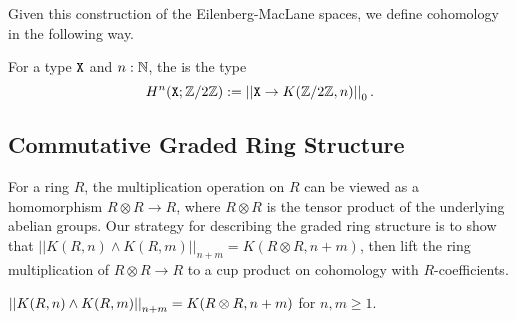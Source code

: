 \documentclass{amsart}
\begin{document}
Given this construction of the Eilenberg-MacLane spaces, we define cohomology in the following way. 

\begin{definition}
	For a type $\mathtt{X}$ and $n:\mathbb{N}$, the  is the type
	\[H^n(\mathtt{X};\mathbb{Z}/2\mathbb{Z}):= \left| \left| \mathtt{X}\rightarrow K(\mathbb{Z}/2\mathbb{Z},n)\right| \right|_0.\] 
\end{definition}



\subsection{Commutative Graded Ring Structure}

For a ring $R$, the multiplication operation on $R$ can be viewed as a homomorphism $R\otimes R\to R$, where $R\otimes R$ is the tensor product of the underlying abelian groups. Our strategy for describing the graded ring structure is to show that $||K(R,n)\wedge K(R,m)||_{n+m} = K(R\otimes R, n+m)$, then  lift the ring multiplication of $R \otimes R \to R$ to a cup product on cohomology with $R$-coefficients.



\begin{proposition}\label{prop:K_smash}
	$ \left| \left| K(R,n) \wedge K(R,m)\right| \right|_{n+m} = K(R \otimes R, n+m)$ for $n,m\geq 1$.
\end{proposition} 
\end{document}
